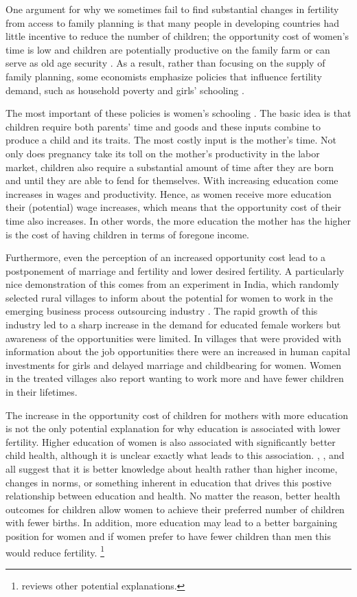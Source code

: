 \documentclass[letterpaper,12pt]{article}
\begin{document}
One argument for why we sometimes fail to find substantial changes in
fertility from access to family planning is that many people in
developing countries had little incentive to reduce the number of
children; the opportunity cost of women's time is low and children are
potentially productive on the family farm or can serve as old age
security \citep{Banerjee2014,Lambert2016}. 
As a result, rather than focusing on the supply of family planning, some
economists emphasize policies that influence fertility demand, such as
household poverty and girls' schooling
\citep{pritchett94a,DasGupta2011}.

The most important of these policies is women's schooling \citep{schultz02}. 
The basic idea is that children require both parents' time and goods and
these inputs combine to produce a child and its traits. 
The most costly input is the mother's time. 
Not only does pregnancy take its toll on the mother's productivity in
the labor market, children also require a substantial amount of time
after they are born and until they are able to fend for themselves. 
With increasing education come increases in wages and productivity. 
Hence, as women receive more education their (potential) wage increases,
which means that the opportunity cost of their time also increases. 
In other words, the more education the mother has the higher is the cost
of having children in terms of foregone income. 

Furthermore, even the perception of an increased opportunity cost lead
to a postponement of marriage and fertility and lower desired fertility.
A particularly nice demonstration of this comes from an experiment in India, 
which randomly selected rural villages to inform about the potential for women
to work in the emerging business process outsourcing industry \citep{Jensen2012}.
The rapid growth of this industry led to a sharp increase in the demand
for educated female workers but awareness of the opportunities were limited.
In villages that were provided with information about the job opportunities
there were an increased in human capital investments for girls and
delayed marriage and childbearing for women. 
Women in the treated villages also report wanting to work more and have 
fewer children in their lifetimes.

The increase in the opportunity cost of children for mothers with more
education is not the only potential explanation for why education is
associated with lower fertility. 
Higher education of women is also associated with significantly better
child health, although it is unclear exactly what leads to this
association.
\citet{Thomas1991}, \citet{Glewwe1999}, and \citet{Kovsted2002}
all suggest that it is better knowledge about health rather 
than higher income, changes in norms, or something inherent in 
education that drives this postive relationship between education
and health.
No matter the reason, better health outcomes for children allow women 
to achieve their preferred number of children with fewer births. 
In addition, more education may lead to a better bargaining position for
women and if women prefer to have fewer children than men this would
reduce fertility.%
\footnote{
\citet{Ainsworth1996} reviews other potential explanations.}
\end{document}

